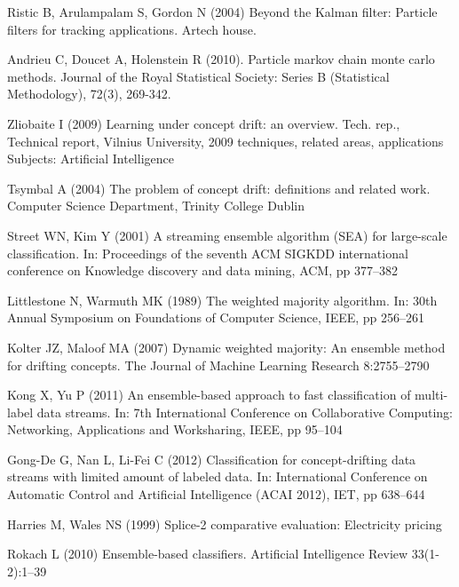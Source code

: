 \documentclass[conference]{IEEEtran}
\begin{document}
\begin{thebibliography}{16}

Ristic B, Arulampalam S, Gordon N (2004) Beyond the Kalman filter: Particle filters for tracking applications. Artech house.

Andrieu C, Doucet A, Holenstein R (2010). Particle markov chain monte carlo methods. Journal of the Royal Statistical Society: Series B (Statistical Methodology), 72(3), 269-342.

Zliobaite I (2009) Learning under concept drift: an overview. Tech. rep.,
  Technical report, Vilnius University, 2009 techniques, related areas,
  applications Subjects: Artificial Intelligence

Tsymbal A (2004) The problem of concept drift: definitions and related work.
  Computer Science Department, Trinity College Dublin

Street WN, Kim Y (2001) A streaming ensemble algorithm {(SEA)} for large-scale
  classification. In: Proceedings of the seventh ACM SIGKDD international
  conference on Knowledge discovery and data mining, ACM, pp 377--382

Littlestone N, Warmuth MK (1989) The weighted majority algorithm. In: 30th
  Annual Symposium on Foundations of Computer Science, IEEE, pp 256--261

Kolter JZ, Maloof MA (2007) Dynamic weighted majority: An ensemble method for
  drifting concepts. The Journal of Machine Learning Research 8:2755--2790

Kong X, Yu P (2011) An ensemble-based approach to fast classification of
  multi-label data streams. In: 7th International Conference on Collaborative
  Computing: Networking, Applications and Worksharing, IEEE, pp 95--104
  
Gong-De G, Nan L, Li-Fei C (2012) Classification for concept-drifting data
  streams with limited amount of labeled data. In: International Conference on
  Automatic Control and Artificial Intelligence (ACAI 2012), IET, pp 638--644

Harries M, Wales NS (1999) Splice-2 comparative evaluation: Electricity pricing

Rokach L (2010) Ensemble-based classifiers. Artificial Intelligence Review
  33(1-2):1--39


\end{thebibliography}
\end{document}
